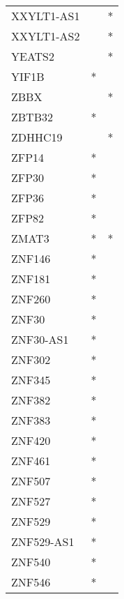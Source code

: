 \begin{longtable}{lcc}
XXYLT1-AS1       &                &          * \\
XXYLT1-AS2       &                &          * \\
YEATS2           &                &          * \\
YIF1B            &              * &            \\
ZBBX             &                &          * \\
ZBTB32           &              * &            \\
ZDHHC19          &                &          * \\
ZFP14            &              * &            \\
ZFP30            &              * &            \\
ZFP36            &              * &            \\
ZFP82            &              * &            \\
ZMAT3            &              * &          * \\
ZNF146           &              * &            \\
ZNF181           &              * &            \\
ZNF260           &              * &            \\
ZNF30            &              * &            \\
ZNF30-AS1        &              * &            \\
ZNF302           &              * &            \\
ZNF345           &              * &            \\
ZNF382           &              * &            \\
ZNF383           &              * &            \\
ZNF420           &              * &            \\
ZNF461           &              * &            \\
ZNF507           &              * &            \\
ZNF527           &              * &            \\
ZNF529           &              * &            \\
ZNF529-AS1       &              * &            \\
ZNF540           &              * &            \\
ZNF546           &              * &            \\

\end{longtable}
